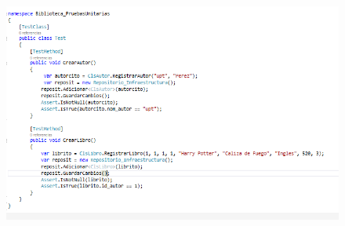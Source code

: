 \documentclass[12pt]{article}
\begin{document}
\begin{enumerate}[label*=\arabic*.]
\begin{enumerate}[label*=\arabic*.]
\begin{figure}[H]
	\begin{Center}
		\includegraphics[width=5.91in,height=4.25in]{./media/pruebas.PNG}
	\end{Center}
\end{figure}


\end{enumerate}
\end{enumerate}\par


\vspace{\baselineskip}

\vspace{\baselineskip}

\vspace{\baselineskip}

\vspace{\baselineskip}

\printbibliography
\end{document}

